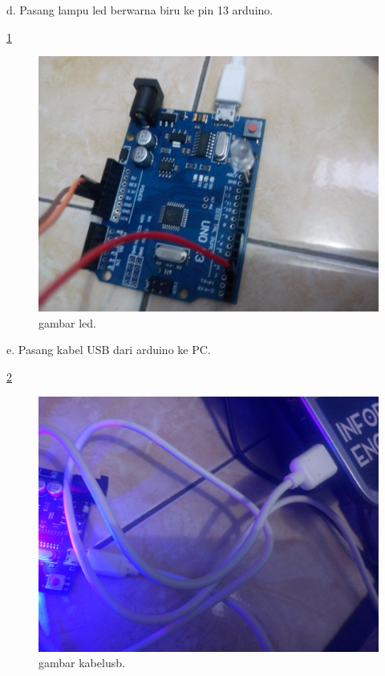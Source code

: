 d. Pasang lampu led berwarna biru ke pin 13 arduino.

\ref{led}

\begin{figure} [ht]
\centerline{\includegraphics[width=1\textwidth]{figures/led.JPG}}
\caption{gambar led.}
\label{led}
\end{figure}

e. Pasang kabel USB dari arduino ke PC.

\ref{kabelusb}

\begin{figure} [ht]
\centerline{\includegraphics[width=1\textwidth]{figures/kabelusb.JPG}}
\caption{gambar kabelusb.}
\label{kabelusb}
\end{figure}

